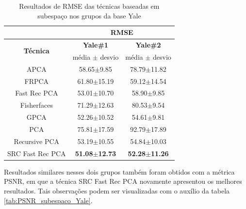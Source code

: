 \begin{table}[H]
\caption{Resultados de RMSE das técnicas baseadas em subespaço nos grupos da base Yale}
\centering
\begin{tabular}{|c|c|c|}
\cline{2-3}
 \multicolumn{1}{c|}{} & \multicolumn{2}{c|}{\textbf{RMSE}}\\ \hline
\multicolumn{1}{|c|}{\multirow{2}{*}{\textbf{Técnica} }}& \textbf{Yale\#1} &  \textbf{Yale\#2}   \\ \cline{2-3}

& média $\pm$ desvio & média $\pm$ desvio \\\hline 
APCA&	        58.65$\pm$9.85	&78.79$\pm$11.82 \\\hline
FRPCA&	        61.80$\pm$15.19	&59.12$\pm$14.54\\\hline
Fast Rec PCA&	53.01$\pm$10.70 &58.90$\pm$9.85\\\hline
Fisherfaces&	71.29$\pm$12.63 &80.53$\pm$9.54\\\hline
GPCA	    &   52.26$\pm$10.52	&54.61$\pm$9.81\\\hline
PCA	         &  75.81$\pm$17.59	&92.79$\pm$17.89\\\hline
Recursive PCA&	53.19$\pm$10.55	&54.84$\pm$10.03\\\hline
SRC Fast Rec PCA &	\textbf{51.08$\pm$12.73}	&\textbf{52.28$\pm$11.26}\\\hline

\end{tabular}
\label{tab:RMSE_subespaco_Yale}
\end{table}

Resultados similares nesses dois grupos também foram obtidos com a métrica PSNR, em que a técnica SRC Fast Rec PCA novamente apresentou os melhores resultados. Tais observações podem ser visualizadas com o auxílio da tabela \ref{tab:PSNR_subespaco_Yale}.

